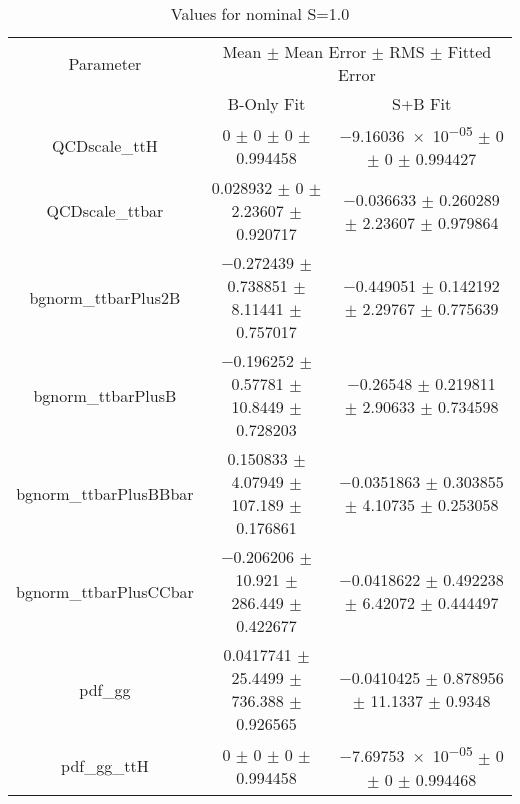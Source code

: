 \begin{table}
\centering
\caption{Values for nominal S=1.0}
\begin{tabular}{ccc}
\toprule
Parameter & \multicolumn{2}{c}{Mean $\pm$ Mean Error $\pm$ RMS $\pm$ Fitted Error}\\
 & B-Only Fit & S+B Fit\\
\midrule
QCDscale\_ttH & \num{0} $\pm$ \num{0} $\pm$ \num{0} $\pm$ \num{0.994458} & \num{-9.16036e-05} $\pm$ \num{0} $\pm$ \num{0} $\pm$ \num{0.994427}\\
QCDscale\_ttbar & \num{0.028932} $\pm$ \num{0} $\pm$ \num{2.23607} $\pm$ \num{0.920717} & \num{-0.036633} $\pm$ \num{0.260289} $\pm$ \num{2.23607} $\pm$ \num{0.979864}\\
bgnorm\_ttbarPlus2B & \num{-0.272439} $\pm$ \num{0.738851} $\pm$ \num{8.11441} $\pm$ \num{0.757017} & \num{-0.449051} $\pm$ \num{0.142192} $\pm$ \num{2.29767} $\pm$ \num{0.775639}\\
bgnorm\_ttbarPlusB & \num{-0.196252} $\pm$ \num{0.57781} $\pm$ \num{10.8449} $\pm$ \num{0.728203} & \num{-0.26548} $\pm$ \num{0.219811} $\pm$ \num{2.90633} $\pm$ \num{0.734598}\\
bgnorm\_ttbarPlusBBbar & \num{0.150833} $\pm$ \num{4.07949} $\pm$ \num{107.189} $\pm$ \num{0.176861} & \num{-0.0351863} $\pm$ \num{0.303855} $\pm$ \num{4.10735} $\pm$ \num{0.253058}\\
bgnorm\_ttbarPlusCCbar & \num{-0.206206} $\pm$ \num{10.921} $\pm$ \num{286.449} $\pm$ \num{0.422677} & \num{-0.0418622} $\pm$ \num{0.492238} $\pm$ \num{6.42072} $\pm$ \num{0.444497}\\
pdf\_gg & \num{0.0417741} $\pm$ \num{25.4499} $\pm$ \num{736.388} $\pm$ \num{0.926565} & \num{-0.0410425} $\pm$ \num{0.878956} $\pm$ \num{11.1337} $\pm$ \num{0.9348}\\
pdf\_gg\_ttH & \num{0} $\pm$ \num{0} $\pm$ \num{0} $\pm$ \num{0.994458} & \num{-7.69753e-05} $\pm$ \num{0} $\pm$ \num{0} $\pm$ \num{0.994468}\\
\bottomrule
\end{tabular}
\end{table}